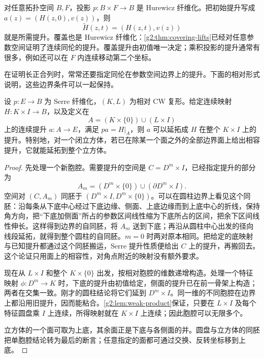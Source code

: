 \begin{example}\label{g2:exm:product-cover-fibrations}
	对任意拓扑空间 \(B,F\)，投影 \(p:B\times F\rightarrow B\) 是 Hurewicz 纤维化。把初始提升写成 \(a(z)=(H(z,0),v(z))\)，则
	\[
		\widetilde H(z,t)=(H(z,t),v(z))
	\]
	就是所需提升。覆盖也是 Hurewicz 纤维化：\cref{g2:thm:covering-lifts}已经对任意参数空间证明了连续同伦的提升。覆盖提升由初值唯一决定；乘积投影的提升通常有很多，例如还可以在 \(F\) 内连续移动第二个坐标。
\end{example}

在证明长正合列时，常常还要指定同伦在参数空间边界上的提升。下面的相对形式说明，这些边界条件可以一起保持。

\begin{lemma}\label{g2:lem:relative-homotopy-lift}
	设 \(p:E\rightarrow B\) 为 Serre 纤维化，\((K,L)\) 为相对 CW 复形。给定连续映射 \(H:K\times I\rightarrow B\)，以及定义在
	\[
		A=(K\times\{0\})\cup(L\times I)
	\]
	上的连续提升 \(a:A\rightarrow E\)，满足 \(pa=H|_A\)，则 \(a\) 可以延拓成 \(H\) 在整个 \(K\times I\) 上的提升。特别地，对一个闭立方体，若已在除某一个面之外的全部边界面上给出相容提升，它就能延拓到整个立方体。
\end{lemma}
\begin{proof}
	先处理一个新胞腔。需要提升的空间是 \(C=D^m\times I\)，已经指定提升的部分为
	\[
		A_m=(D^m\times\{0\})\cup(\partial D^m\times I).
	\]
	空间对 \((C,A_m)\) 同胚于 \((D^m\times I,D^m\times\{0\})\)。可以在圆柱边界上看见这个同胚：沿每条从下底中心经过下底边缘、侧面、上底边缘而到上底中心的折线，保持角方向，把“下底加侧面”所占的参数区间线性缩为下底所占的区间，把余下区间线性伸长。这样得到边界的自同胚，将 \(A_m\) 送到下底；再沿从圆柱中心出发的径向线段延拓，就得到整个圆柱的自同胚。\(m=0\) 时两对原本相同。把给定的底映射与已知提升都通过这个同胚搬运，Serre 提升性质便给出 \(C\) 上的提升，再搬回去。这个论证只用面上的相容性，对角点附近的映射没有额外要求。

	现在从 \(L\times I\) 和整个 \(K\times\{0\}\) 出发，按相对胞腔的维数递增构造。处理一个特征映射 \(\phi:D^m\rightarrow K\) 时，下底的提升由初值给定，侧面的提升已在前一骨架上构造；两者在交集一致。刚才的圆柱结论将它们延到 \(D^m\times I\)。同一维的不同胞腔在边界上都沿用旧提升，因而能粘合。\cref{g2:lem:weak-product}保证，只要在 \(L\times I\) 及每个特征圆盘乘 \(I\) 上连续，所得映射就在 \(K\times I\) 上连续；因此胞腔可以无限多个。

	立方体的一个面可取为上底，其余面正是下底与各侧面的并。圆盘与立方体的同胚把单胞腔结论转为最后的断言；任意指定的面都可通过交换、反转坐标移到上底。
\end{proof}

